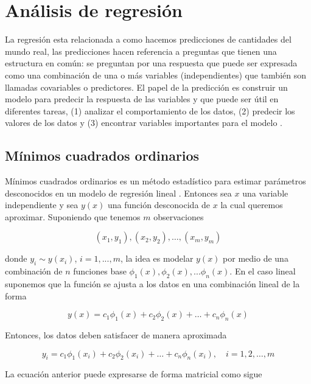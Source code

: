 \section{Análisis de regresión}
La regresión esta relacionada a como hacemos predicciones de cantidades del mundo real, las predicciones hacen referencia a preguntas que tienen una estructura en común: se preguntan por una respuesta que puede ser expresada como una combinación de una o más variables (independientes) que también son llamadas covariables o predictores. El papel de la predicción es construir un modelo para predecir la respuesta de las variables y que puede ser útil en diferentes tareas, (1) analizar el comportamiento de los datos, (2) predecir los valores de los datos y (3) encontrar variables importantes para el modelo \cite{igualIntroductionDataScience2017}.
\subsection{Mínimos cuadrados ordinarios}

Mínimos cuadrados ordinarios es un método estadístico para estimar parámetros desconocidos en un modelo de regresión lineal \cite{juarez4toColoquioDepartamento}. Entonces sea $x$ una variable independiente y sea $y(x)$ una función desconocida de $x$ la cual queremos aproximar. Suponiendo que tenemos $m$ observaciones

\[
\left(x_{1}, y_{1}\right),\left(x_{2}, y_{2}\right), \ldots,\left(x_{m}, y_{m}\right)
\]

donde $y_i \sim y(x_i)$, $i=1,...,m$, la idea es modelar $y(x)$ por medio de una combinación de $n$ funciones base $\phi_1(x),\phi_2(x),...\phi_n(x)$. En el caso lineal suponemos que la función se ajusta a los datos en una combinación lineal de la forma 

\[
y(x)=c_{1} \phi_{1}(x)+c_{2} \phi_{2}(x)+\ldots+c_{n} \phi_{n}(x)
\]

Entonces, los datos deben satisfacer de manera aproximada

\[
y_{i}=c_{1} \phi_{1}\left(x_{i}\right)+c_{2} \phi_{2}\left(x_{i}\right)+\ldots+c_{n} \phi_{n}\left(x_{i}\right), \quad i=1,2, \ldots, m
\]

La ecuación anterior puede expresarse de forma matricial como sigue

